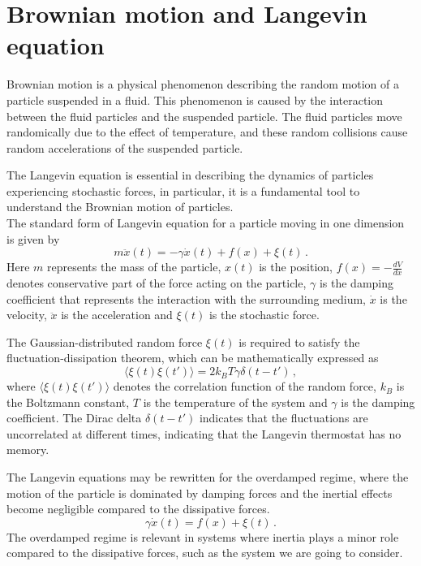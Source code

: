 \section{Brownian motion and Langevin equation} \label{Langevineq}
Brownian motion is a physical phenomenon describing the random motion of a particle suspended in a fluid. This phenomenon is caused by the interaction between the fluid particles and the suspended particle. The fluid particles move randomically due to the effect of temperature, and these random collisions cause random accelerations of the suspended particle.

The Langevin equation is essential in describing the dynamics of particles experiencing stochastic forces, in particular, it is a fundamental tool to understand the Brownian motion of particles.
\\
The standard form of Langevin equation for a particle moving in one dimension is given by
\begin{equation}
    m \ddot{x}(t) = - \gamma \dot{x}(t) + f(x) + \xi(t) \, .
    \label{LangEq}
\end{equation}
Here $m$ represents the mass of the particle, $x(t)$ is the position, $f(x)=-\frac{dV}{dx}$ denotes conservative part of the force acting on the particle, $\gamma$ is the damping coefficient that represents the interaction with the surrounding medium, $\dot{x}$ is the velocity, $\ddot{x}$ is the acceleration and $\xi(t)$ is the stochastic force.

The Gaussian-distributed random force $\xi(t)$ is required to satisfy the fluctuation-dissipation theorem, which can be mathematically expressed as
\begin{equation}
    \langle \xi(t)\xi(t') \rangle = 2 k_B T \gamma \delta(t-t')\, ,
\end{equation}
where $\langle \xi(t)\xi(t') \rangle$ denotes the correlation function of the random force, $k_B$ is the Boltzmann constant, $T$ is the temperature of the system and $\gamma$ is the damping coefficient. The Dirac delta $\delta(t-t')$ indicates that the fluctuations are uncorrelated at different times, indicating that the Langevin thermostat has no memory.

The Langevin equations may be rewritten for the overdamped regime, where the motion of the particle is dominated 
by damping forces and the inertial effects become negligible compared to the dissipative forces.
\begin{equation}
    \gamma \dot{x}(t) = f(x) + \xi(t)\, .
\end{equation}
The overdamped regime is relevant in systems where inertia plays a minor role compared to the dissipative forces, such as the system we are going to consider.
